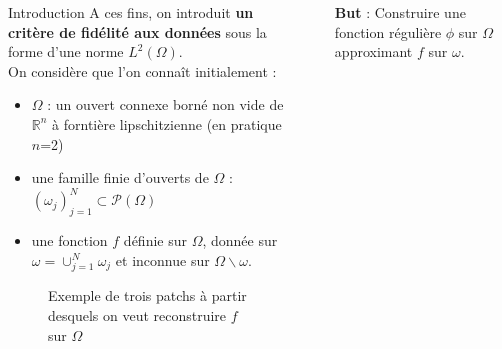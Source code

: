 \documentclass[final]{beamer}
\newlength{\sepwid}
\newlength{\onecolwid}
\newlength{\twocolwid}
\begin{document}
\begin{frame}[t]
\begin{columns}[t]
\begin{column}{\onecolwid}
\begin{block}{Introduction}
A ces fins, on introduit \textbf{un critère de fidélité aux données} sous la forme d'une norme $L^2(\Omega)$.\\

On considère que l'on connaît initialement :
\begin{itemize}
\item $\Omega$ : un ouvert connexe borné non vide de $\mathbb{R}^n$ à forntière lipschitzienne (en pratique $n$=2)
\item une famille finie d'ouverts de $\Omega$ : $(\omega_j)^N_{j=1} \subset \mathcal{P}(\Omega)$
\item une fonction $f$ définie sur $\Omega$, donnée sur $\omega = \cup_{j=1}^N\omega_j$ et inconnue sur $\Omega \backslash \omega$.
\end{itemize}
	

\end{block}


\begin{figure}

\caption{Exemple de trois patchs à partir desquels on veut reconstruire $f$ sur $\Omega$}
\label{fig1}
\end{figure}


\end{column} %

\begin{column}{\sepwid}\end{column} %

\begin{column}{\twocolwid} %

\begin{columns}[t,totalwidth=\twocolwid] %

\begin{column}{\onecolwid}\vspace{-.6in} %

%	
\begin{block}{}
\textbf{But} : Construire une fonction régulière $\phi$ sur $\Omega$ approximant $f$ sur $\omega$.\\


\end{block}
\end{column}
\end{columns}
\end{column}
\end{columns}
\end{frame}
\end{document}
